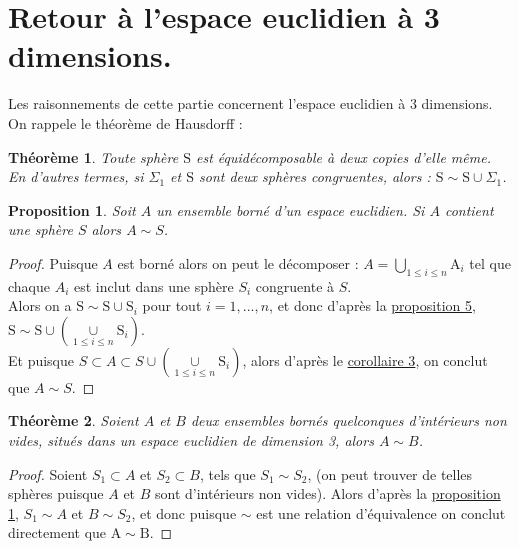 \newtheorem{TT}{Théorème}
\newtheorem{PP}{Proposition}

\section{Retour à l'espace euclidien à 3 dimensions.}
\noindent
Les raisonnements de cette partie concernent l'espace euclidien à $3$ dimensions.
On rappele le théorème de Hausdorff :
\begin{TT}
  \hfill

  Toute sphère $\mathrm{S}$ est équidécomposable à deux copies d'elle même. En d'autres termes, si $\Sigma_1$ et $\mathrm{S}$ sont deux sphères congruentes, alors : $\mathrm{S} \sim \mathrm{S} \cup \Sigma_1$.
\end{TT}

\begin{PP}\label{pp}
  Soit $A$ un ensemble borné d'un espace euclidien.
  Si $A$ contient une sphère $S$ alors $A \sim S$.
\end{PP}
\begin{proof}
  Puisque $A$ est borné alors on peut le décomposer : $A = \underset{1\le i \le n}{\bigcup}\mathrm{A}_i$ tel que chaque $A_i$ est inclut dans une sphère $S_i$ congruente à $S$.\\
  Alors on a $\mathrm{S} \sim \mathrm{S} \cup \mathrm{S}_i$ pour tout $i=1,...,n$, et donc d'après la \hyperref[pr5]{proposition 5}, $\mathrm{S} \sim \mathrm{S} \cup \left(\underset{1\le i \le n}{\cup}\mathrm{S}_i\right)$.\\
  Et puisque $S \subset A \subset S \cup \left(\underset{1\le i \le n}{\cup}\mathrm{S}_i\right)$, alors d'après le \hyperref[c2]{corollaire 3}, on conclut que $A \sim S$.
\end{proof}
\begin{TT}
  Soient $A$ et $B$ deux ensembles bornés quelconques d'intérieurs non vides, situés dans un espace euclidien de dimension 3, alors $A \sim B$.
\end{TT}
\begin{proof}
  Soient $S_1 \subset A$ et $S_2 \subset B$, tels que $S_1 \sim S_2$, (on peut trouver de telles sphères puisque $A$ et $B$ sont d'intérieurs non vides). Alors d'après la \hyperref[pp]{proposition 1}, $S_1 \sim A$ et $B \sim S_2$, et donc puisque $\sim$ est une relation d'équivalence on conclut directement que $\mathrm{A} \sim \mathrm{B}$.
\end{proof}


